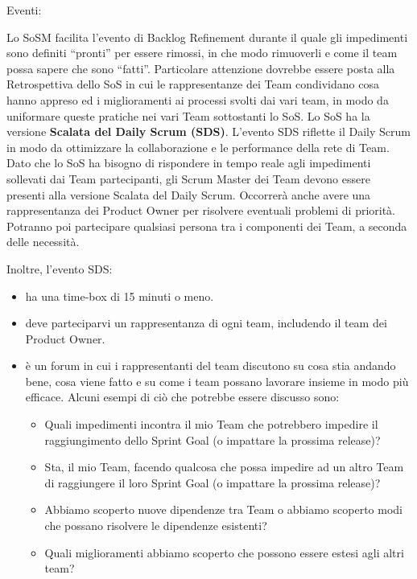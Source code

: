 \documentclass[12pt,a4paper,parskip=full]{scrartcl}
\begin{document}
Eventi:

Lo SoSM facilita l'evento di Backlog Refinement durante il quale gli impedimenti sono definiti ``pronti'' per essere rimossi, in che modo rimuoverli e come il team possa sapere che sono ``fatti''. Particolare attenzione dovrebbe essere posta alla Retrospettiva dello SoS in cui le rappresentanze dei Team condividano cosa hanno appreso ed i miglioramenti ai processi svolti dai vari team, in modo da uniformare queste pratiche nei vari Team sottostanti lo SoS.
Lo SoS ha la versione \textbf{Scalata del Daily Scrum (SDS)}. L'evento SDS riflette il Daily Scrum in modo da ottimizzare la collaborazione e le performance della rete di Team. Dato che lo SoS ha bisogno di rispondere in tempo reale agli impedimenti sollevati dai Team partecipanti, gli Scrum Master dei Team devono essere presenti alla versione Scalata del Daily Scrum. Occorrerà anche avere una rappresentanza dei Product Owner per risolvere eventuali problemi di priorità. Potranno poi partecipare qualsiasi persona tra i componenti dei Team, a seconda delle necessità.

Inoltre, l'evento SDS:

\begin{itemize}
\item ha una time-box di 15 minuti o meno.
\item deve parteciparvi un rappresentanza di ogni team, includendo il team dei Product Owner.
\item è un forum in cui i rappresentanti del team discutono su cosa stia andando bene, cosa viene fatto e su come i team possano lavorare insieme in modo più efficace. Alcuni esempi di ciò che potrebbe essere discusso sono:
\begin{itemize}
\item Quali impedimenti incontra il mio Team che potrebbero impedire il raggiungimento dello Sprint Goal (o impattare la prossima release)? 
\item Sta, il mio Team, facendo qualcosa che possa impedire ad un altro Team di raggiungere il loro Sprint Goal (o impattare la prossima release)?
\item Abbiamo scoperto nuove dipendenze tra Team o abbiamo scoperto modi che possano risolvere le dipendenze esistenti?
\item Quali miglioramenti abbiamo scoperto che possono essere estesi agli altri team?
\end{itemize}
\end{itemize}
\end{document}
